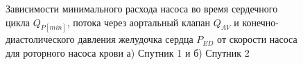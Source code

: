 \begin{figure}[ht]
  \begin{minipage}[ht]{0.49\linewidth}
  \end{minipage}
  \hfill
  \begin{minipage}[ht]{0.49\linewidth}
  \end{minipage}
  \caption{Зависимости минимального расхода насоса во время сердечного цикла $Q_{P[min]}$, потока через аортальный клапан $Q_{AV}$ и конечно-диастолического давления желудочка сердца $P_{ED}$ от скорости насоса для роторного насоса крови а) Спутник 1 и б) Спутник 2}
  \label{img:cvs_rbp_investigation_c5}  
\end{figure}

